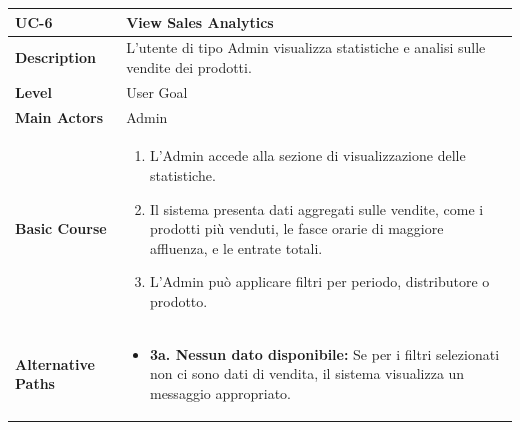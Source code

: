 \begin{table}[H]
\centering
\begin{tabularx}{\textwidth}{|p{2.5cm}|X|}
\hline
\textbf{UC-6} & \textbf{View Sales Analytics} \\
\hline
\textbf{Description} & L'utente di tipo Admin visualizza statistiche e analisi sulle vendite dei prodotti. \\
\hline
\textbf{Level} & User Goal \\
\hline
\textbf{Main Actors} & Admin \\
\hline
\textbf{Basic Course} &
\begin{enumerate}
    \item L'Admin accede alla sezione di visualizzazione delle statistiche.
    \item Il sistema presenta dati aggregati sulle vendite, come i prodotti più venduti, le fasce orarie di maggiore affluenza, e le entrate totali.
    \item L'Admin può applicare filtri per periodo, distributore o prodotto.
\end{enumerate} \\
\hline
\textbf{Alternative Paths} &
\begin{itemize}
    \item \textbf{3a. Nessun dato disponibile:} Se per i filtri selezionati non ci sono dati di vendita, il sistema visualizza un messaggio appropriato.
\end{itemize} \\
\hline
\end{tabularx}
\end{table}

